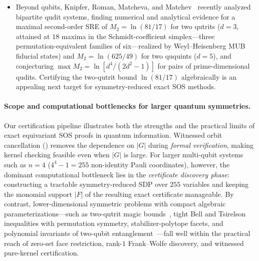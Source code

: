 \documentclass[11pt,a4paper]{article}
\theoremstyle{plain}
\theoremstyle{definition}
\theoremstyle{remark}
\begin{document}
\begin{itemize}[leftmargin=1.8em, itemsep=2pt]
  \item Beyond qubits, Knipfer, Roman, Matcheva, and Matchev~\cite{Knipfer2026} recently analyzed bipartite qudit systems, finding numerical and analytical evidence for a maximal second-order SRE of $M_2 = \ln(81/17)$ for two qutrits ($d=3$, attained at $18$ maxima in the Schmidt-coefficient simplex---three permutation-equivalent families of six---realized by Weyl--Heisenberg MUB fiducial states) and $M_2 = \ln(625/49)$ for two ququints ($d=5$), and conjecturing $\max M_2 = \ln[d^4/(2d^2-1)]$ for pairs of prime-dimensional qudits. Certifying the two-qutrit bound $\ln(81/17)$ algebraically is an appealing next target for symmetry-reduced exact SOS methods.
\end{itemize}

\paragraph{Scope and computational bottlenecks for larger quantum symmetries.}
Our certification pipeline illustrates both the strengths and the practical limits of exact equivariant SOS proofs in quantum information. Witnessed orbit cancellation () removes the dependence on $\lvert G\rvert$ during \emph{formal verification}, making kernel checking feasible even when $\lvert G\rvert$ is large. For larger multi-qubit systems such as $n = 4$ ($4^4 - 1 = 255$ non-identity Pauli coordinates), however, the dominant computational bottleneck lies in the \emph{certificate discovery phase}: constructing a tractable symmetry-reduced SDP over $255$ variables and keeping the monomial support $\lvert F\rvert$ of the resulting exact certificate manageable. By contrast, lower-dimensional symmetric problems with compact algebraic parameterizations---such as two-qutrit magic bounds~\cite{Knipfer2026}, tight Bell and Tsirelson inequalities with permutation symmetry, stabilizer-polytope facets, and polynomial invariants of two-qubit entanglement~\cite{Makhlin2002}---fall well within the practical reach of zero-set face restriction, rank-$1$ Frank--Wolfe discovery, and witnessed pure-kernel certification.

\end{document}

